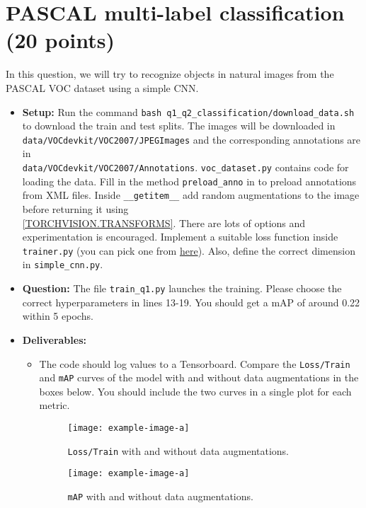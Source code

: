 \documentclass[11pt,addpoints,answers]{exam}
\numberwithin{equation}{section} %
\numberwithin{figure}{section} %
\numberwithin{table}{section} %
\begin{document}
\section{PASCAL multi-label classification (20 points)}
In this question, we will try to recognize objects in natural images from the PASCAL VOC dataset using a simple CNN.
\begin{itemize}
    \item \textbf{Setup:}  Run the command \texttt{bash q1\_q2\_classification/download\_data.sh} to download the train and test splits. The images will be downloaded in \\
\texttt{data/VOCdevkit/VOC2007/JPEGImages} and the corresponding annotations are in \\
{\texttt{data/VOCdevkit/VOC2007/Annotations}}. \texttt{voc\_dataset.py} contains code for loading the data. Fill in the method \texttt{preload\_anno} in to preload annotations from XML files. Inside \texttt{\_\_getitem\_\_} add random augmentations to the image before returning it using \\
\href{https://pytorch.org/vision/stable/transforms.html}{[TORCHVISION.TRANSFORMS]}. There are lots of options and experimentation is encouraged. Implement a suitable loss function inside \texttt{trainer.py} (you can pick one from \href{https://pytorch.org/docs/stable/nn.html#loss-functions}{here}). Also, define the correct dimension in \texttt{simple\_cnn.py}. 
\item \textbf{Question:} The file \texttt{train\_q1.py} launches the training. Please choose the correct hyperparameters in lines 13-19. You should get a mAP of around 0.22 within 5 epochs.
\item \textbf{Deliverables:} 
    \begin{itemize}
        \item The code should log values to a Tensorboard. Compare the \texttt{Loss/Train} and \texttt{mAP} curves of the model with and without data augmentations in the boxes below. You should include the two curves in a single plot for each metric.

        \begin{figure}[H]
            \centering
            \texttt{[image: example-image-a]}
            \caption{\texttt{Loss/Train} with and without data augmentations.}
            \label{fig:q1_1_compare_loss}
        \end{figure}
        
        \begin{figure}[H]
            \centering
            \texttt{[image: example-image-a]}
            \caption{\texttt{mAP} with and without data augmentations.}
            \label{fig:q1_1_compare_map}
        \end{figure}
        

\end{itemize}
\end{itemize}
\end{document}
